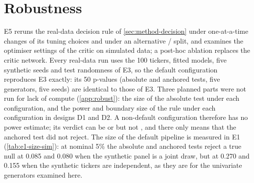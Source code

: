 \section{Robustness}\label{sec:robust}

E5 reruns the real-data decision rule of \cref{sec:method-decision} under one-at-a-time changes of
its tuning choices and under an alternative \TRAIN/\TEST{} split, and examines the optimiser
settings of the critic on simulated data; a post-hoc ablation replaces the critic network. Every
real-data run uses the 100 tickers, fitted models, five synthetic seeds and test randomness of
E3, so the default configuration reproduces E3 exactly: its 50 p-values (absolute \WC{} and
anchored tests, five generators, five seeds) are identical to those of E3. Three planned parts
were not run for lack of compute (\cref{app:robust}): the size of the absolute test under each
configuration, and the power and boundary size of the rule under each configuration in designs
D1 and D2. A non-default configuration therefore has no power estimate; its verdict can be \BAD{}
or \INCONCL{} but not \GOOD, and \INCONCL{} there only means that the anchored test did not
reject. The size of the default pipeline is measured in E1 (\cref{tab:e1-size-sim}): at nominal
5\% the absolute \WC{} and anchored tests reject a true null at 0.085 and 0.080 when the synthetic
panel is a joint draw, but at 0.270 and 0.155 when the synthetic tickers are independent, as they
are for the univariate generators examined here.


